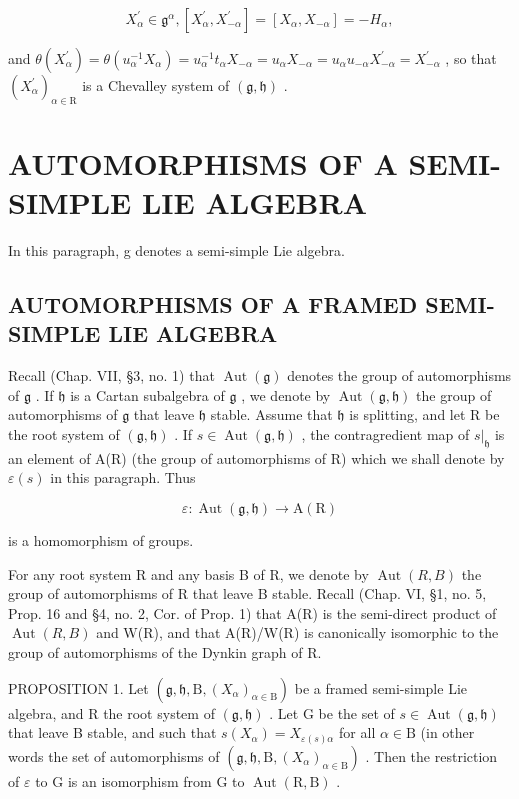 \[
X _ {\alpha} ^ {\prime} \in \mathfrak {g} ^ {\alpha}, [ X _ {\alpha} ^ {\prime}, X _ {- \alpha} ^ {\prime} ] = [ X _ {\alpha}, X _ {- \alpha} ] = - H _ {\alpha},
\]

and \(\theta(X_{\alpha}^{\prime}) = \theta(u_{\alpha}^{-1}X_{\alpha}) = u_{\alpha}^{-1}t_{\alpha}X_{-\alpha} = u_{\alpha}X_{-\alpha} = u_{\alpha}u_{-\alpha}X_{-\alpha}^{\prime} = X_{-\alpha}^{\prime}\) , so that \((X_{\alpha}^{\prime})_{\alpha \in \mathrm{R}}\) is a Chevalley system of \((\mathfrak{g},\mathfrak{h})\) .

\section{AUTOMORPHISMS OF A SEMI-SIMPLE LIE ALGEBRA}

In this paragraph, g denotes a semi-simple Lie algebra.

\subsection{AUTOMORPHISMS OF A FRAMED SEMI-SIMPLE LIE ALGEBRA}

Recall (Chap. VII, §3, no. 1) that \(\operatorname{Aut}(\mathfrak{g})\) denotes the group of automorphisms of \(\mathfrak{g}\) . If \(\mathfrak{h}\) is a Cartan subalgebra of \(\mathfrak{g}\) , we denote by \(\operatorname{Aut}(\mathfrak{g},\mathfrak{h})\) the group of automorphisms of \(\mathfrak{g}\) that leave \(\mathfrak{h}\) stable. Assume that \(\mathfrak{h}\) is splitting, and let R be the root system of \((\mathfrak{g},\mathfrak{h})\) . If \(s\in\operatorname{Aut}(\mathfrak{g},\mathfrak{h})\) , the contragredient map of \(s|_{\mathfrak{h}}\) is an element of A(R) (the group of automorphisms of R) which we shall denote by \(\varepsilon(s)\) in this paragraph. Thus

\[
\varepsilon : \operatorname{Aut} (\mathfrak {g}, \mathfrak {h}) \to \mathrm{A} (\mathrm{R})
\]

is a homomorphism of groups.

For any root system R and any basis B of R, we denote by \(\operatorname{Aut}(R,B)\) the group of automorphisms of R that leave B stable. Recall (Chap. VI, §1, no. 5, Prop. 16 and §4, no. 2, Cor. of Prop. 1) that A(R) is the semi-direct product of \(\operatorname{Aut}(R,B)\) and W(R), and that A(R)/W(R) is canonically isomorphic to the group of automorphisms of the Dynkin graph of R.

PROPOSITION 1. Let \((\mathfrak{g},\mathfrak{h},\mathrm{B},(X_{\alpha})_{\alpha \in \mathrm{B}})\) be a framed semi-simple Lie algebra, and R the root system of \((\mathfrak{g},\mathfrak{h})\) . Let G be the set of \(s\in \operatorname {Aut}(\mathfrak{g},\mathfrak{h})\) that leave B stable, and such that \(s(X_{\alpha}) = X_{\varepsilon (s)\alpha}\) for all \(\alpha \in \mathrm{B}\) (in other words the set of automorphisms of \((\mathfrak{g},\mathfrak{h},\mathrm{B},(X_{\alpha})_{\alpha \in \mathrm{B}})\) . Then the restriction of \(\varepsilon\) to \(\mathrm{G}\) is an isomorphism from \(\mathrm{G}\) to \(\operatorname {Aut}(\mathrm{R},\mathrm{B})\) .

